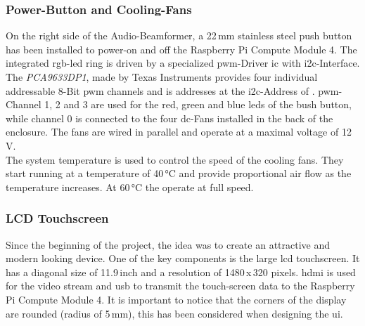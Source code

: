 \subsubsection{Power-Button and Cooling-Fans}
On the right side of the Audio-Beamformer, a 22\,mm stainless steel push button has been installed to power-on and off the Raspberry Pi Compute Module 4. The integrated \acrshort{rgb}-\acrshort{led} ring is driven by a specialized \acrshort{pwm}-Driver \acrshort{ic} with \acrshort{i2c}-Interface. The \textit{PCA9633DP1}, made by Texas Instruments provides four individual addressable 8-Bit \acrshort{pwm} channels and is addresses at the \acrshort{i2c}-Address of . \acrshort{pwm}-Channel 1, 2 and 3 are used for the red, green and blue \acrshort{led}s of the bush button, while channel 0 is connected to the four \acrshort{dc}-Fans installed in the back of the enclosure. The fans are wired in parallel and operate at a maximal voltage of 12\,V.\\
The system temperature is used to control the speed of the cooling fans. They start running at a temperature of 40\,°C and provide proportional air flow as the temperature increases. At 60\,°C the operate at full speed.

\subsubsection{LCD Touchscreen}
Since the beginning of the project, the idea was to create an attractive and modern looking device. One of the key components is the large \acrshort{lcd} touchscreen. It has a diagonal size of 11.9\,inch and a resolution of 1480\,x\,320 pixels. \acrshort{hdmi} is used for the video stream and \acrshort{usb} to transmit the touch-screen data to the Raspberry Pi Compute Module 4. It is important to notice that the corners of the display are rounded (radius of 5\,mm), this has been considered when designing the \acrlong{ui}.

